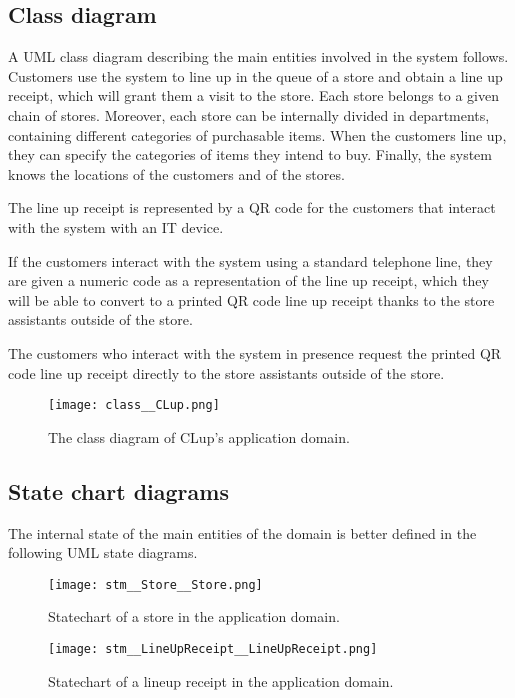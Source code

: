 \documentclass[../../main.tex]{subfiles}
\begin{document}
\subsection{Class diagram}

A UML class diagram describing the main entities involved in the system follows.
Customers use the system to line up in the queue of a store and obtain a line up
receipt, which will grant them a visit to the store. Each store belongs to a given
chain of stores. Moreover, each store can be internally divided in departments,
containing different categories of purchasable items. When the customers line
up, they can specify the categories of items they intend to buy. Finally, the
system knows the locations of the customers and of the stores.

The line up receipt is represented by a QR code for the customers that interact with the system with an IT device.

If the customers interact with the system using a standard telephone line, they are given a numeric code as a representation of the line up receipt, which they will be able to convert to a printed QR code line up receipt thanks to the store assistants outside of the store.

The customers who interact with the system in presence request the printed QR code line up receipt directly to the store assistants outside of the store.

\begin{figure}[h!]
    \centering
    \texttt{[image: class\_\_CLup.png]}
    \caption{The class diagram of CLup's application domain.}
\end{figure}

\subsection{State chart diagrams}

The internal state of the main entities of the domain is better defined in the following UML
state diagrams.

\begin{figure}[h!]
    \centering
    \texttt{[image: stm\_\_Store\_\_Store.png]}
    \caption{Statechart of a store in the application domain.}
\end{figure}

\begin{figure}[h!]
    \centering
    \texttt{[image: stm\_\_LineUpReceipt\_\_LineUpReceipt.png]}
    \caption{Statechart of a lineup receipt in the application domain.}
\end{figure}
\end{document}
